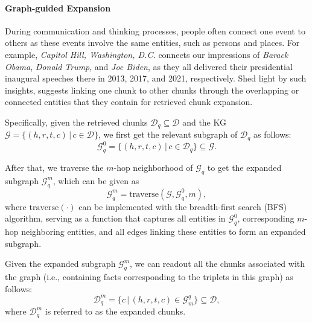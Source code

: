 \paragraph{Graph-guided Expansion}
During communication and thinking processes, people often connect one event to others as these events involve the same entities, such as persons and places.
For example, \textit{Capitol Hill, Washington, D.C.} connects our impressions of \textit{Barack Obama}, \textit{Donald Trump}, and \textit{Joe Biden}, as they all delivered their presidential inaugural speeches there in 2013, 2017, and 2021, respectively.
Shed light by such insights, \modelname suggests linking one chunk to other chunks through the overlapping or connected entities that they contain for retrieved chunk expansion.

Specifically, given the retrieved chunks $\mathcal{D}_q\subseteq\mathcal{D}$ and the KG $\mathcal{G}=\{(h,r,t,c)\,|\,c\in\mathcal{D}\}$, we first get the relevant subgraph of $\mathcal{D}_q$ as follows:
\begin{equation}
\label{eq:subgraph}
\mathcal{G}_q^0 = \{(h,r,t,c)\,|\,c\in\mathcal{D}_q\}\subseteq\mathcal{G}.
\end{equation}

After that, we traverse the $m$-hop neighborhood of $\mathcal{G}_q$ to get the expanded subgraph $\mathcal{G}_q^m$, which can be given as
\begin{equation}
\label{eq:traverse}
\mathcal{G}_q^m = \text{traverse}(\mathcal{G},\mathcal{G}_q^0,m),
\end{equation}
where $\text{traverse}(\cdot)$ can be implemented with the breadth-first search (BFS) algorithm,
serving as a function that captures all entities in $\mathcal{G}_q^0$, corresponding $m$-hop neighboring entities, and all edges linking these entities to form an expanded subgraph.

Given the expanded subgraph $\mathcal{G}_q^m$, we can readout all the chunks associated with the graph (i.e., containing facts corresponding to the triplets in this graph) as follows:
\begin{equation}
\label{eq:expansion}
\mathcal{D}_q^m = \{c\,|\,(h,r,t,c)\in\mathcal{G}_m^q\}\subseteq\mathcal{D},
\end{equation}
where $\mathcal{D}_q^m$ is referred to as the expanded chunks.

